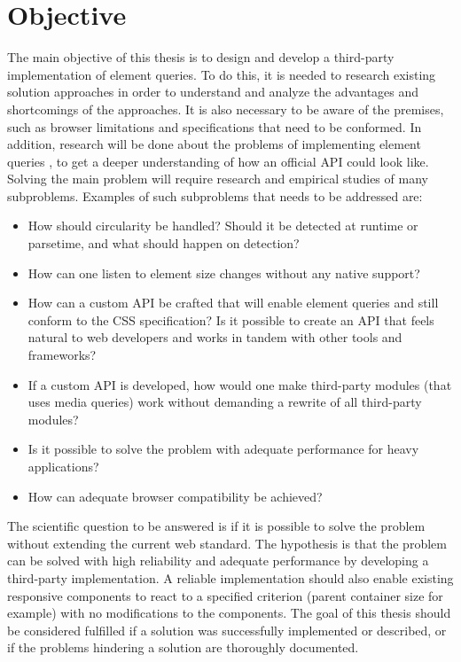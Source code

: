 \documentclass[a4paper,11pt]{kth-mag}
\begin{document}
    \section{Objective}
      The main objective of this thesis is to design and develop a \gls{third-party} implementation of element queries.
      To do this, it is needed to research existing solution approaches in order to understand and analyze the advantages and shortcomings of the approaches.
      It is also necessary to be aware of the premises, such as \gls{browser} limitations and specifications that need to be conformed.
      In addition, research will be done about the problems of implementing element queries , to get a deeper understanding of how an official \gls{API} could look like.
      Solving the main problem will require research and empirical studies of many subproblems.
      Examples of such subproblems that needs to be addressed are:
      \begin{itemize}
        \item How should circularity be handled? Should it be detected at runtime or parsetime, and what should happen on detection?
        \item How can one listen to \gls{element} size changes without any \gls{native} support?
        \item How can a custom \gls{API} be crafted that will enable element queries and still conform to the \gls{CSS} specification? Is it possible to create an API that feels natural to \gls{web} developers and works in tandem with other tools and frameworks?
        \item If a custom \gls{API} is developed, how would one make \gls{third-party} modules (that uses \gls{media queries}) work without demanding a rewrite of all \gls{third-party} modules? 
        \item Is it possible to solve the problem with adequate performance for heavy applications?
        \item How can adequate \gls{browser} compatibility be achieved?
      \end{itemize}
      The scientific question to be answered is if it is possible to solve the problem  without extending the current \gls{web} standard.
      The hypothesis is that the problem can be solved with high reliability and adequate performance by developing a \gls{third-party} implementation.
      A reliable implementation should also enable existing \gls{responsive} components to react to a specified criterion (parent container size for example) with no modifications to the components.
      The goal of this thesis should be considered fulfilled if a solution was successfully implemented or described, or if the problems hindering a solution are thoroughly documented.
\end{document}
